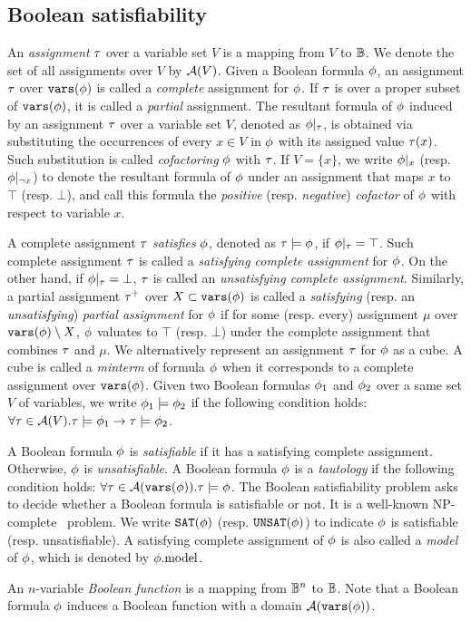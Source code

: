 \subsection{Boolean satisfiability}
An \textit{assignment} $\tau$ over a variable set $V$ is a mapping from $V$ to $\mathbb{B}$.
We denote the set of all assignments over $V$ by $\mathcal{A}(V)$.
Given a Boolean formula $\phi$,
an assignment $\tau$ over $\texttt{vars}(\phi)$ is called a \textit{complete} assignment for $\phi$.
If $\tau$ is over a proper subset of $\texttt{vars}(\phi)$, it is called a \textit{partial} assignment.
The resultant formula of $\phi$ induced by an assignment $\tau$ over a variable set $V$,
denoted as $\phi|_{\tau}$,
is obtained via substituting the occurrences of every $x\in V$ in $\phi$ with its assigned value $\tau(x)$.
Such substitution is called \textit{cofactoring} $\phi$ with $\tau$.
If $V=\{x\}$, we write $\phi|_{x}$ (resp. $\phi|_{\lnot x}$) to denote the resultant formula of $\phi$ under an assignment that maps $x$ to $\top$ (resp. $\bot$),
and call this formula the \textit{positive} (resp. \textit{negative}) \textit{cofactor} of $\phi$ with respect to variable $x$.

A complete assignment $\tau$ \textit{satisfies} $\phi$, denoted as $\tau\models\phi$, if $\phi|_{\tau}=\top$.
Such complete assignment $\tau$ is called a \textit{satisfying complete assignment} for $\phi$.
On the other hand, if $\phi|_{\tau}=\bot$, $\tau$ is called an \textit{unsatisfying complete assignment}.
Similarly, a partial assignment $\tau^+$ over $X\subset\texttt{vars}(\phi)$ is called a \textit{satisfying} (resp. an \textit{unsatisfying}) \textit{partial assignment} for $\phi$
if for some (resp. every) assignment $\mu$ over $\texttt{vars}(\phi)\setminus X$,
$\phi$ valuates to $\top$ (resp. $\bot$) under the complete assignment that combines $\tau$ and $\mu$.
We alternatively represent an assignment $\tau$ for $\phi$ as a cube.
A cube is called a \textit{minterm} of formula $\phi$ when it corresponds to a complete assignment over $\texttt{vars}(\phi)$.
Given two Boolean formulas $\phi_1$ and $\phi_2$ over a same set $V$ of variables,
we write $\phi_1\models\phi_2$ if the following condition holds:
$\forall\tau\in\mathcal{A}(V).\tau\models\phi_1\rightarrow\tau\models\phi_2$.


A Boolean formula $\phi$ is \textit{satisfiable} if it has a satisfying complete assignment.
Otherwise, $\phi$ is \textit{unsatisfiable}.
A Boolean formula $\phi$ is a \textit{tautology} if the following condition holds:
$\forall\tau\in\mathcal{A}(\texttt{vars}(\phi)).\tau\models\phi$.
The Boolean satisfiability problem asks to decide whether a Boolean formula is satisfiable or not.
It is a well-known NP-complete~\cite{Cook1971} problem.
We write $\texttt{SAT}(\phi)$ (resp. $\texttt{UNSAT}(\phi)$) to indicate $\phi$ is satisfiable (resp. unsatisfiable).
A satisfying complete assignment of $\phi$ is also called a \textit{model} of $\phi$, which is denoted by $\phi.\mathrm{model}$.

An $n$-variable \textit{Boolean function} is a mapping from $\mathbb{B}^n$ to $\mathbb{B}$.
Note that a Boolean formula $\phi$ induces a Boolean function with a domain $\mathcal{A}(\texttt{vars}(\phi))$.
